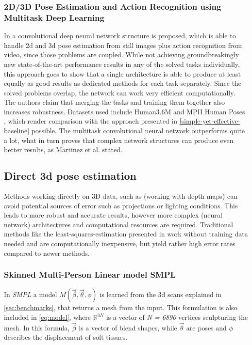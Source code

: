\subsubsection{2D/3D Pose Estimation and Action Recognition using Multitask Deep Learning}
In \cite{Luvizon2018} a convolutional deep neural network structure is proposed, which is able to handle 2d and 3d pose estimation from still images plus action recognition from video, since those problems are coupled. While not achieving groundbreakingly new state-of-the-art performance results in any of the solved tasks individually, this approach goes to show that a single architecture is able to produce at least equally as good results as dedicated methods for each task separately. Since the solved problems overlap, the network can work very efficient computationally. The authors claim that merging the tasks and training them together also increases robustness. Datasets used include Human3.6M \cite{H3.6M} and MPII Human Poses \cite{andriluka14cvpr}, which render comparison with the approach presented in \autoref{simple-yet-effective-baseline} possible. The multitask convolutional neural network outperforms \cite{Martinez_2017_ICCV} quite a lot, what in turn proves that complex network structures can produce even better results, as Martinez et al. stated.


\subsection{Direct 3d pose estimation}
Methods working directly on 3D data, such as \cite{Ye2011} (working with depth maps) can avoid potential sources of error such as projections or lighting conditions. This leads to more robust and accurate results, however more complex (neural network) architectures and computational resources are required. Traditional methods like the least-squares-estimation presented in \cite{Haralick98} work without training data needed and are computationally inexpensive, but yield rather high error rates compared to newer methods.

\subsubsection{Skinned Multi-Person Linear model SMPL}
\label{sec:SMPL}
In \emph{SMPL} a model $M(\vec{\beta},\vec{\theta},\phi)$ is learned from the 3d scans explained in \autoref{sec:benchmarks}, that returns a mesh from the input. This formulation is also included in \autoref{eq:model}, where $\mathbb{R}^{3N}$ is a vector of \emph{N = 6890} vertices sculpturing the mesh. In this formula, $\vec{\beta}$ is a vector of blend shapes, while $\vec{\theta}$ are poses and $\phi$ describes the displacement of soft tissues.

